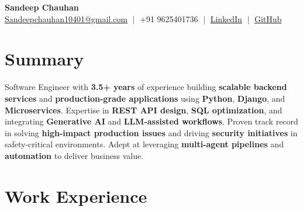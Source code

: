 \documentclass[a4paper,9pt]{extarticle}
\begin{document}
\begin{center}
  {\LARGE \textbf{Sandeep Chauhan}}\\[4pt]
  \small
  \href{mailto:Sandeepchauhan10401@gmail.com}{\textcolor{linkblue}{Sandeepchauhan10401@gmail.com}} $\;\vert\;$
  +91 9625401736 $\;\vert\;$
  \href{https://linkedin.com/in/sandeep-chauhan-243012181}{\textcolor{linkblue}{LinkedIn}} $\;\vert\;$
  \href{https://github.com/sandeep-chauhan-self}{\textcolor{linkblue}{GitHub}}
\end{center}

\section{Summary}
\small
Software Engineer with \textbf{3.5+ years} of experience building \textbf{scalable backend services} and \textbf{production-grade applications} using \textbf{Python}, \textbf{Django}, and \textbf{Microservices}. Expertise in \textbf{REST API design}, \textbf{SQL optimization}, and integrating \textbf{Generative AI} and \textbf{LLM-assisted workflows}. Proven track record in solving \textbf{high-impact production issues} and driving \textbf{security initiatives} in safety-critical environments. Adept at leveraging \textbf{multi-agent pipelines} and \textbf{automation} to deliver business value.

\section{Work Experience}
\end{document}
